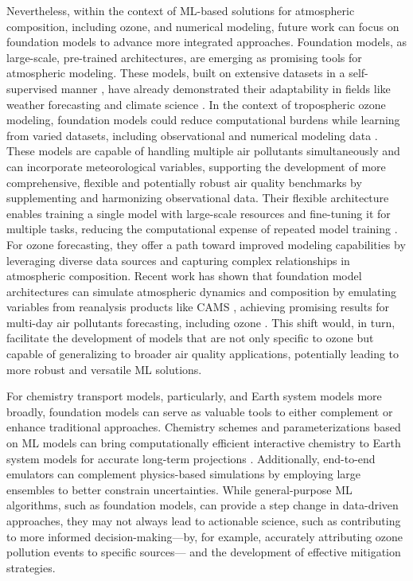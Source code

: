 \documentclass[gmd, manuscript]{copernicus}
\begin{document}
Nevertheless, within the context of ML-based solutions for atmospheric composition, including ozone, and numerical modeling, future work can focus on foundation models to advance more integrated approaches. Foundation models, as large-scale, pre-trained architectures, are emerging as promising tools for atmospheric modeling. These models, built on extensive datasets in a self-supervised manner  \citet{bommasani2021opportunities}, have already demonstrated their adaptability in fields like weather forecasting and climate science \citep{lessig2023atmorep, nguyen2023climax}. In the context of tropospheric ozone modeling, foundation models could reduce computational burdens while learning from varied datasets, including observational and numerical modeling data \citep{mukkavilli_ai_2023}. These models are capable of handling multiple air pollutants simultaneously and can incorporate meteorological variables, supporting the development of more comprehensive, flexible and potentially robust air quality benchmarks by supplementing and harmonizing observational data. Their flexible architecture enables training a single model with large-scale resources and fine-tuning it for multiple tasks, reducing the computational expense of repeated model training \citep{bommasani2021opportunities}. For ozone forecasting, they offer a path toward improved modeling capabilities by leveraging diverse data sources and capturing complex relationships in atmospheric composition. Recent work has shown that foundation model architectures can simulate atmospheric dynamics and composition by emulating variables from reanalysis products like CAMS \citep{Inness}, achieving promising results for multi-day air pollutants forecasting, including ozone \citep{Bodnar2024}. This shift would, in turn, facilitate the development of models that are not only specific to ozone but capable of generalizing to broader air quality applications, potentially leading to more robust and versatile ML solutions. 

For chemistry transport models, particularly, and Earth system models more broadly, foundation models can serve as valuable tools to either complement or enhance traditional approaches. Chemistry schemes and parameterizations based on ML models can bring computationally efficient interactive chemistry to Earth system models for accurate long-term projections \citep{Eyring2016}. Additionally, end-to-end emulators can complement physics-based simulations by employing large ensembles to better constrain uncertainties. While general-purpose ML algorithms, such as foundation models, can provide a step change in data-driven approaches, they may not always lead to actionable science, such as contributing to more informed decision-making—by, for example, accurately attributing ozone pollution events to specific sources— and the development of effective mitigation strategies.
\end{document}
